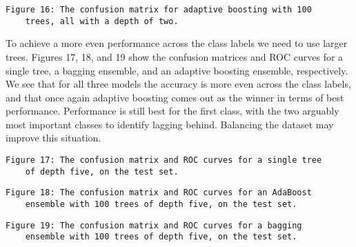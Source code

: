\documentclass[11pt]{article}
\begin{document}
 
  \begin{center}
 \end{center}
\begin{Verbatim}[commandchars=\\\{\}]
 	Figure 16: The confusion matrix for adaptive boosting with 100 
 	trees, all with a depth of two.
 \end{Verbatim}
 
 
 To achieve a more even performance across the class labels we need to use larger trees. Figures 17, 18, and 19 show the confusion matrices and ROC curves for a single tree, a bagging ensemble, and an adaptive boosting ensemble, respectively. We see that for all three models the accuracy is more even across the class labels, and that once again adaptive boosting comes out as the winner in terms of best performance. Performance is still best for the first class, with the two arguably most important classes to identify lagging behind. Balancing the dataset may improve this situation. 
 
   \begin{center}
 \end{center}
\begin{Verbatim}[commandchars=\\\{\}]
	Figure 17: The confusion matrix and ROC curves for a single tree 
	of depth five, on the test set.
\end{Verbatim}
 
 
    \begin{center}
 \end{center}
 \begin{Verbatim}[commandchars=\\\{\}]
 	Figure 18: The confusion matrix and ROC curves for an AdaBoost 
 	ensemble with 100 trees of depth five, on the test set.
 \end{Verbatim}

 
     \begin{center}
 \end{center}
\begin{Verbatim}[commandchars=\\\{\}]
	Figure 19: The confusion matrix and ROC curves for a bagging 
	ensemble with 100 trees of depth five, on the test set.
\end{Verbatim}
 
\end{document}
